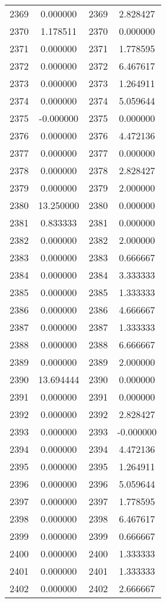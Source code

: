 \documentclass[12pt]{article}
\begin{document}
\begin{longtable}{@{}cccc@{}}
2369 & 0.000000 & 2369 & 2.828427 \\
2370 & 1.178511 & 2370 & 0.000000 \\
2371 & 0.000000 & 2371 & 1.778595 \\
2372 & 0.000000 & 2372 & 6.467617 \\
2373 & 0.000000 & 2373 & 1.264911 \\
2374 & 0.000000 & 2374 & 5.059644 \\
2375 & -0.000000 & 2375 & 0.000000 \\
2376 & 0.000000 & 2376 & 4.472136 \\
2377 & 0.000000 & 2377 & 0.000000 \\
2378 & 0.000000 & 2378 & 2.828427 \\
2379 & 0.000000 & 2379 & 2.000000 \\
2380 & 13.250000 & 2380 & 0.000000 \\
2381 & 0.833333 & 2381 & 0.000000 \\
2382 & 0.000000 & 2382 & 2.000000 \\
2383 & 0.000000 & 2383 & 0.666667 \\
2384 & 0.000000 & 2384 & 3.333333 \\
2385 & 0.000000 & 2385 & 1.333333 \\
2386 & 0.000000 & 2386 & 4.666667 \\
2387 & 0.000000 & 2387 & 1.333333 \\
2388 & 0.000000 & 2388 & 6.666667 \\
2389 & 0.000000 & 2389 & 2.000000 \\
2390 & 13.694444 & 2390 & 0.000000 \\
2391 & 0.000000 & 2391 & 0.000000 \\
2392 & 0.000000 & 2392 & 2.828427 \\
2393 & 0.000000 & 2393 & -0.000000 \\
2394 & 0.000000 & 2394 & 4.472136 \\
2395 & 0.000000 & 2395 & 1.264911 \\
2396 & 0.000000 & 2396 & 5.059644 \\
2397 & 0.000000 & 2397 & 1.778595 \\
2398 & 0.000000 & 2398 & 6.467617 \\
2399 & 0.000000 & 2399 & 0.666667 \\
2400 & 0.000000 & 2400 & 1.333333 \\
2401 & 0.000000 & 2401 & 1.333333 \\
2402 & 0.000000 & 2402 & 2.666667 \\

\end{longtable}
\end{document}
